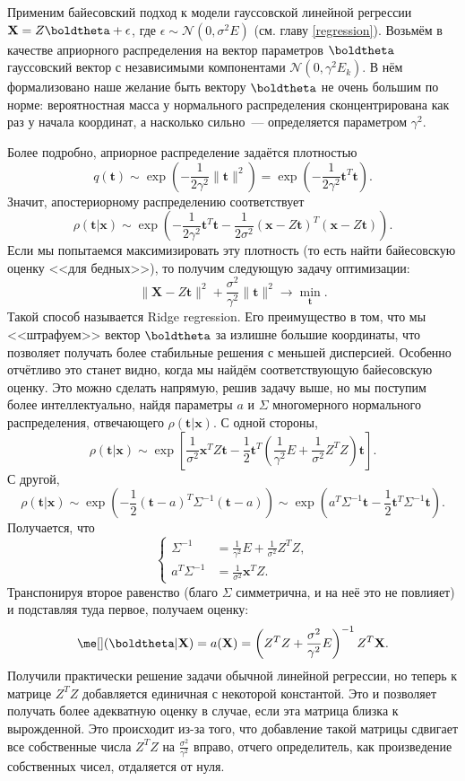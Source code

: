 \begin{example}\label{ridge_and_lasso}
Применим байесовский подход к модели гауссовской линейной регрессии $\mathbf X = Z\boldtheta + \epsilon$, где $\epsilon \sim \mathcal{N}(0, \sigma^2E)$ (см. главу \ref{regression}). Возьмём в качестве априорного распределения на вектор параметров $\boldtheta$ гауссовский вектор с независимыми компонентами $\mathcal{N}(0, \gamma^2 E_k)$. В нём формализовано наше желание быть вектору $\boldtheta$ не очень большим по норме: вероятностная масса у нормального распределения сконцентрирована как раз у начала координат, а насколько сильно~--- определяется параметром $\gamma^2$.

Более подробно, априорное распределение задаётся плотностью
\[
q(\mathbf t) \sim \exp\left(-\frac{1}{2\gamma^2}\|\mathbf t\|^2\right) = \exp\left(-\frac{1}{2\gamma^2}\mathbf t^T \mathbf t\right).
\]
Значит, апостериорному распределению соответствует
\[
\rho(\mathbf t|\mathbf{x}) \sim 
\exp\left(-\frac{1}{2\gamma^2}\mathbf t^T \mathbf t - \frac{1}{2\sigma^2} (\mathbf{x} - Z\mathbf t)^T (\mathbf{x} - Z\mathbf t)\right).
\]
Если мы попытаемся максимизировать эту плотность (то есть найти байесовскую оценку <<для бедных>>), то получим следующую задачу оптимизации:
\[
\|\mathbf X - Z \mathbf t\|^2 + \frac{\sigma^2}{\gamma^2} \| \mathbf t\|^2 \to \min_{\mathbf t}.
\]
Такой способ называется \textsf{Ridge regression}. Его преимущество в том, что мы <<штрафуем>> вектор $\boldtheta$ за излишне большие координаты, что позволяет получать более стабильные решения с меньшей дисперсией. Особенно отчётливо это станет видно, когда мы найдём соответствующую байесовскую оценку. Это можно сделать напрямую, решив задачу выше, но мы поступим более интеллектуально, найдя параметры $a$ и $\Sigma$ многомерного нормального распределения, отвечающего $\rho(\mathbf t|\mathbf{x})$. С одной стороны,
\[
\rho(\mathbf t|\mathbf{x}) \sim \exp\left[ \frac{1}{\sigma^2} \mathbf{x}^T Z\mathbf t - \frac{1}{2} \mathbf t^T \left( \frac{1}{\gamma^2} E + \frac{1}{\sigma^2} Z^T Z\right) \mathbf t\right].
\]
С другой, 
\[
\rho(\mathbf t|\mathbf{x}) \sim \exp\left(-\frac{1}{2} (\mathbf t-a)^T\Sigma^{-1}(\mathbf t-a)\right) \sim 
    \exp\left(a^T \Sigma^{-1} \mathbf t - \frac{1}{2} \mathbf t^T\Sigma^{-1} \mathbf t  \right).
\]
Получается, что
\[
\left\{
    \begin{aligned}
    \Sigma^{-1} &= \frac{1}{\gamma^2} E + \frac{1}{\sigma^2} Z^T Z,\\
    a^T \Sigma^{-1} &= \frac{1}{\sigma^2} \mathbf{x}^T Z.
    \end{aligned}
    \right.
\]
Транспонируя второе равенство (благо $\Sigma$ симметрична, и на неё это не повлияет) и подставляя туда первое, получаем оценку:
\[
\me[](\boldtheta|\mathbf X) = a(\mathbf X) = \left(Z^T Z + \frac{\sigma^2}{\gamma^2} E\right)^{-1} Z^T \mathbf X.
\]
Получили практически решение задачи обычной линейной регрессии, но теперь к матрице $Z^T Z$ добавляется единичная с некоторой константой. Это и позволяет получать более адекватную оценку в случае, если эта матрица близка к вырожденной. Это происходит из-за того, что добавление такой матрицы сдвигает все собственные числа $Z^T Z$ на $\frac{\sigma^2}{\gamma^2}$ вправо, отчего определитель, как произведение собственных чисел, отдаляется от нуля. 


\end{example}
